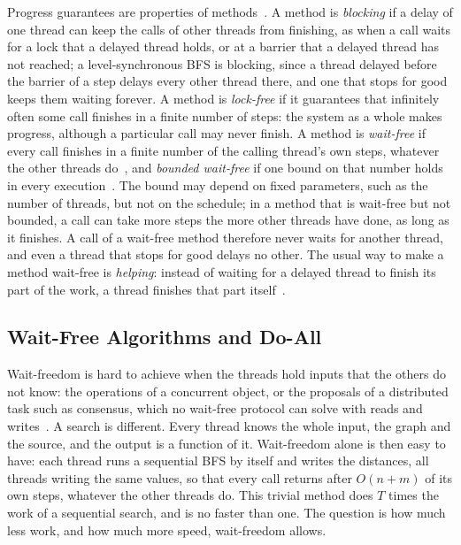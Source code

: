 Progress guarantees are properties of methods~\cite{aomp}. A method is \emph{blocking} if a delay of one thread can keep the calls of other threads from finishing, as when a call waits for a lock that a delayed thread holds, or at a barrier that a delayed thread has not reached; a level-synchronous BFS is blocking, since a thread delayed before the barrier of a step delays every other thread there, and one that stops for good keeps them waiting forever. A method is \emph{lock-free} if it guarantees that infinitely often some call finishes in a finite number of steps: the system as a whole makes progress, although a particular call may never finish. A method is \emph{wait-free} if every call finishes in a finite number of the calling thread's own steps, whatever the other threads do~\cite{herlihy_waitfree}, and \emph{bounded wait-free} if one bound on that number holds in every execution~\cite{herlihy_waitfree, aomp}. The bound may depend on fixed parameters, such as the number of threads, but not on the schedule; in a method that is wait-free but not bounded, a call can take more steps the more other threads have done, as long as it finishes. A call of a wait-free method therefore never waits for another thread, and even a thread that stops for good delays no other. The usual way to make a method wait-free is \emph{helping}: instead of waiting for a delayed thread to finish its part of the work, a thread finishes that part itself~\cite{aomp, kogan_fastwf}.

\subsection{Wait-Free Algorithms and Do-All}
\label{sec:bg-doall}

Wait-freedom is hard to achieve when the threads hold inputs that the others do not know: the operations of a concurrent object, or the proposals of a distributed task such as consensus, which no wait-free protocol can solve with reads and writes~\cite{flp, herlihy_waitfree, herlihy_shavit_topology}. A search is different. Every thread knows the whole input, the graph and the source, and the output is a function of it. Wait-freedom alone is then easy to have: each thread runs a sequential BFS by itself and writes the distances, all threads writing the same values, so that every call returns after $O(n+m)$ of its own steps, whatever the other threads do. This trivial method does $T$ times the work of a sequential search, and is no faster than one. The question is how much less work, and how much more speed, wait-freedom allows.

